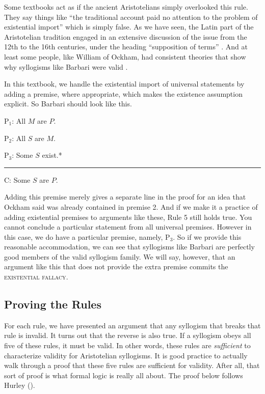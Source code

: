 Some textbooks act as if the ancient Aristotelians simply overlooked this rule. They say things like ``the traditional account paid no attention to the problem of existential import'' which is simply false. As we have seen, the Latin part of the Aristotelian tradition engaged in an extensive discussion of the issue from the 12th to the 16th centuries, under the heading ``supposition of terms'' \citep{Read2002}. And at least some people, like William of Ockham, had consistent theories that show why syllogisms like Barbari were valid \citep{Parsons2008}. 

In this textbook, we handle the existential import of universal statements by adding a premise, where appropriate, which makes the existence assumption explicit. So Barbari should look like this.

\begin{earg}
\item[P$_1$:] All $M$ are $P$.
\item[P$_2$:] All $S$ are $M$.
\item[P$_3$:] Some $S$ exist.*
\vspace{-.5em}
\item [] \rule{0.2\linewidth}{.5pt} 
\item[C:] Some $S$ are $P$.
\end{earg} 

Adding this premise merely gives a separate line in the proof for an idea that Ockham said was already contained in premise 2. And if we make it a practice of adding existential premises to arguments like these, Rule 5 still holds true. You cannot conclude a particular statement from all universal premises. However in this case, we do have a particular premise, namely, P$_3$. So if we provide this reasonable accommodation, we can see that syllogisms like Barbari are perfectly good members of the valid syllogism family. We will say, however, that an argument like this that does not provide the extra premise commits the 
\textsc{\gls{existential fallacy}}. \label{def:existential_fallacy}



\subsection{Proving the Rules}

For each rule, we have presented an argument that any syllogism that breaks that rule is invalid. It turns out that the reverse is also true. If a syllogism obeys all five of these rules, it must be valid. In other words, these rules are \emph{sufficient} to characterize validity for Aristotelian syllogisms.  It is good practice to actually walk through a proof that these five rules are sufficient for validity. After all, that sort of proof is what formal logic is really all about. The proof below follows Hurley (\cite*	{Hurley2014}).


